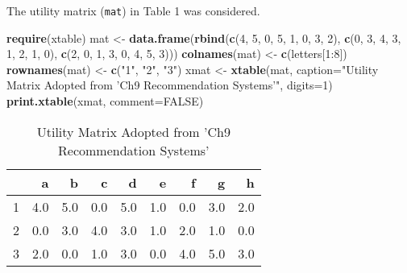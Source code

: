 \documentclass[]{article}
\newenvironment{Shaded}{\begin{snugshade}}{\end{snugshade}}
\newcommand{\KeywordTok}[1]{\textcolor[rgb]{0.13,0.29,0.53}{\textbf{{#1}}}}
\newcommand{\DataTypeTok}[1]{\textcolor[rgb]{0.13,0.29,0.53}{{#1}}}
\newcommand{\DecValTok}[1]{\textcolor[rgb]{0.00,0.00,0.81}{{#1}}}
\newcommand{\StringTok}[1]{\textcolor[rgb]{0.31,0.60,0.02}{{#1}}}
\newcommand{\OtherTok}[1]{\textcolor[rgb]{0.56,0.35,0.01}{{#1}}}
\newcommand{\NormalTok}[1]{{#1}}
\begin{document}
The utility matrix (\texttt{mat}) in Table 1 was considered.

\begin{Shaded}
\begin{Highlighting}[]
\KeywordTok{require}\NormalTok{(xtable)}
\NormalTok{mat <-}\StringTok{ }\KeywordTok{data.frame}\NormalTok{(}\KeywordTok{rbind}\NormalTok{(}\KeywordTok{c}\NormalTok{(}\DecValTok{4}\NormalTok{, }\DecValTok{5}\NormalTok{, }\DecValTok{0}\NormalTok{, }\DecValTok{5}\NormalTok{, }\DecValTok{1}\NormalTok{, }\DecValTok{0}\NormalTok{, }\DecValTok{3}\NormalTok{, }\DecValTok{2}\NormalTok{),}
                 \KeywordTok{c}\NormalTok{(}\DecValTok{0}\NormalTok{, }\DecValTok{3}\NormalTok{, }\DecValTok{4}\NormalTok{, }\DecValTok{3}\NormalTok{, }\DecValTok{1}\NormalTok{, }\DecValTok{2}\NormalTok{, }\DecValTok{1}\NormalTok{, }\DecValTok{0}\NormalTok{),}
                 \KeywordTok{c}\NormalTok{(}\DecValTok{2}\NormalTok{, }\DecValTok{0}\NormalTok{, }\DecValTok{1}\NormalTok{, }\DecValTok{3}\NormalTok{, }\DecValTok{0}\NormalTok{, }\DecValTok{4}\NormalTok{, }\DecValTok{5}\NormalTok{, }\DecValTok{3}\NormalTok{)))}
\KeywordTok{colnames}\NormalTok{(mat) <-}\StringTok{ }\KeywordTok{c}\NormalTok{(letters[}\DecValTok{1}\NormalTok{:}\DecValTok{8}\NormalTok{])}
\KeywordTok{rownames}\NormalTok{(mat) <-}\StringTok{ }\KeywordTok{c}\NormalTok{(}\StringTok{"1"}\NormalTok{, }\StringTok{"2"}\NormalTok{, }\StringTok{"3"}\NormalTok{)}
\NormalTok{xmat <-}\StringTok{ }\KeywordTok{xtable}\NormalTok{(mat, }
               \DataTypeTok{caption=}\StringTok{"Utility Matrix Adopted from 'Ch9 Recommendation Systems'"}\NormalTok{,}
               \DataTypeTok{digits=}\DecValTok{1}\NormalTok{)}
\KeywordTok{print.xtable}\NormalTok{(xmat, }\DataTypeTok{comment=}\OtherTok{FALSE}\NormalTok{)}
\end{Highlighting}
\end{Shaded}

\begin{table}[ht]
\centering
\begin{tabular}{rrrrrrrrr}
  \hline
 & a & b & c & d & e & f & g & h \\ 
  \hline
1 & 4.0 & 5.0 & 0.0 & 5.0 & 1.0 & 0.0 & 3.0 & 2.0 \\ 
  2 & 0.0 & 3.0 & 4.0 & 3.0 & 1.0 & 2.0 & 1.0 & 0.0 \\ 
  3 & 2.0 & 0.0 & 1.0 & 3.0 & 0.0 & 4.0 & 5.0 & 3.0 \\ 
   \hline
\end{tabular}
\caption{Utility Matrix Adopted from 'Ch9 Recommendation Systems'} 
\end{table}
\end{document}
